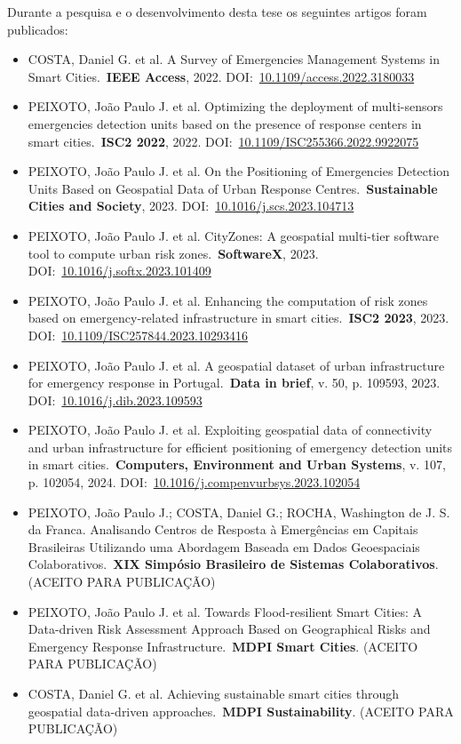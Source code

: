 \begin{refsection}
Durante a pesquisa e o desenvolvimento desta tese os seguintes artigos foram publicados:

\begin{itemize}
  \item COSTA, Daniel G. et al. A Survey of Emergencies Management Systems in Smart Cities.\ \textbf{IEEE Access}, 2022. DOI:\ \hyperref{https://doi.org/10.1109/access.2022.3180033}{}{}{10.1109/access.2022.3180033}
  \item PEIXOTO, João Paulo J. et al. Optimizing the deployment of multi-sensors emergencies detection units based on the presence of response centers in smart cities.\ \textbf{ISC2 2022}, 2022. DOI:\ \hyperref{https://doi.org/10.1109/ISC255366.2022.9922075}{}{}{10.1109/ISC255366.2022.9922075}
  \item PEIXOTO, João Paulo J. et al. On the Positioning of Emergencies Detection Units Based on Geospatial Data of Urban Response Centres.\ \textbf{Sustainable Cities and Society}, 2023. DOI:\ \hyperref{https://doi.org/10.1016/j.scs.2023.104713}{}{}{10.1016/j.scs.2023.104713}
  \item PEIXOTO, João Paulo J. et al. CityZones: A geospatial multi-tier software tool to compute urban risk zones.\ \textbf{SoftwareX}, 2023. DOI:\ \hyperref{https://doi.org/10.1016/j.softx.2023.101409}{}{}{10.1016/j.softx.2023.101409}
  \item PEIXOTO, João Paulo J. et al. Enhancing the computation of risk zones based on emergency-related infrastructure in smart cities.\ \textbf{ISC2 2023}, 2023. DOI:\ \hyperref{https://doi.org/10.1109/ISC257844.2023.10293416}{}{}{10.1109/ISC257844.2023.10293416}
  \item PEIXOTO, João Paulo J. et al. A geospatial dataset of urban infrastructure for emergency response in Portugal.\ \textbf{Data in brief}, v. 50, p. 109593, 2023. DOI:\ \hyperref{https://doi.org/10.1016/j.dib.2023.109593}{}{}{10.1016/j.dib.2023.109593}
  \item PEIXOTO, João Paulo J. et al. Exploiting geospatial data of connectivity and urban infrastructure for efficient positioning of emergency detection units in smart cities.\ \textbf{Computers, Environment and Urban Systems}, v. 107, p. 102054, 2024. DOI:\ \hyperref{https://doi.org/10.1016/j.compenvurbsys.2023.102054}{}{}{10.1016/j.compenvurbsys.2023.102054}
  \item PEIXOTO, João Paulo J.; COSTA, Daniel G.; ROCHA, Washington de J. S. da Franca. Analisando Centros de Resposta à Emergências em Capitais Brasileiras Utilizando uma Abordagem Baseada em Dados Geoespaciais Colaborativos.\ \textbf{XIX Simpósio Brasileiro de Sistemas Colaborativos}. (ACEITO PARA PUBLICAÇÃO)
  \item PEIXOTO, João Paulo J. et al. Towards Flood-resilient Smart Cities: A Data-driven Risk Assessment Approach Based on Geographical Risks and Emergency Response Infrastructure.\ \textbf{MDPI Smart Cities}. (ACEITO PARA PUBLICAÇÃO)
  \item COSTA, Daniel G. et al. Achieving sustainable smart cities through geospatial data-driven approaches.\ \textbf{MDPI Sustainability}. (ACEITO PARA PUBLICAÇÃO)
\end{itemize}


\end{refsection}
